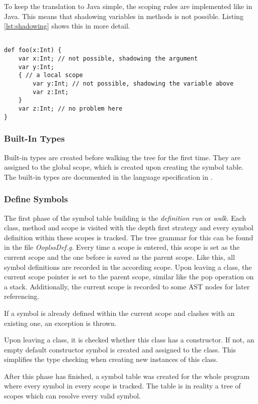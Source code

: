 To keep the translation to Java simple, the scoping rules are implemented
like in Java. This means that shadowing variables in methods is not possible.
Listing \ref{lst:shadowing} shows this in more detail.

\begin{lstlisting}[float=ht,language=ooplss,caption=Shadowing variables.,label=lst:shadowing]

def foo(x:Int) {
	var x:Int; // not possible, shadowing the argument
	var y:Int;
	{ // a local scope
		var y:Int; // not possible, shadowing the variable above
		var z:Int;
	}
	var z:Int; // no problem here
}
\end{lstlisting}

\subsubsection{Built-In Types}
Built-in types are created before walking the tree for the first time.
They are assigned to the global scope, which is created upon creating the symbol
table. The built-in types are documented in the language specification in
.

\subsubsection{Define Symbols}
The first phase of the symbol table building is the \emph{definition run}
or \emph{walk}. Each class, method and scope is visited with the
depth first strategy and every symbol definition within these scopes
is tracked. The tree grammar for this can be found in the file
\emph{OoplssDef.g}. Every time a scope is entered, this scope is set
as the current scope and the one before is saved as the parent scope.
Like this, all symbol definitions are recorded in the according scope.
Upon leaving a class, the current scope pointer is set to
the parent scope, similar like the pop operation on a stack.
Additionally, the current scope is recorded to some AST nodes for later
referencing.

If a symbol is already defined within the current scope and clashes with
an existing one, an exception is thrown.

Upon leaving a class, it is checked whether this class has a constructor.
If not, an empty default constructor symbol is created and assigned to the
class. This simplifies the type checking when creating new instances
of this class.

After this phase has finished, a symbol table was created for the whole
program where every symbol in every scope is tracked. The table is in reality
a tree of scopes which can resolve every valid symbol.

